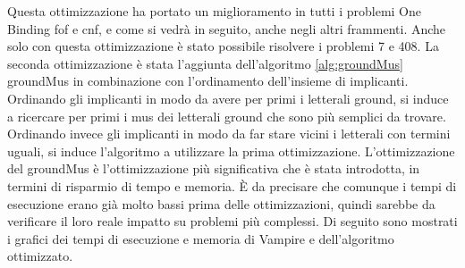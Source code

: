 \documentclass[./main.tex]{subfiles}
\begin{document}
Questa ottimizzazione ha portato un miglioramento in tutti i problemi One Binding fof e cnf, e come si vedrà in seguito, 
anche negli altri frammenti. 
Anche solo con questa ottimizzazione è stato possibile risolvere i problemi 7 e 408.
La seconda ottimizzazione è stata l'aggiunta dell'algoritmo \ref{alg:groundMus} groundMus 
in combinazione con l'ordinamento dell'insieme di implicanti.
Ordinando gli implicanti in modo da avere per primi i letterali ground, si induce a ricercare per 
primi i mus dei letterali ground che sono più semplici da trovare.
Ordinando invece gli implicanti in modo da far stare vicini i letterali con termini uguali, si induce 
l'algoritmo a utilizzare la prima ottimizzazione.
L'ottimizzazione del groundMus è l'ottimizzazione più significativa che è stata introdotta, in termini di risparmio di tempo e memoria.
È da precisare che comunque i tempi di esecuzione erano già molto bassi prima delle ottimizzazioni,
quindi sarebbe da verificare il loro reale impatto su problemi più complessi.
Di seguito sono mostrati i grafici dei tempi di esecuzione e memoria di Vampire e dell'algoritmo ottimizzato.



\end{document}
